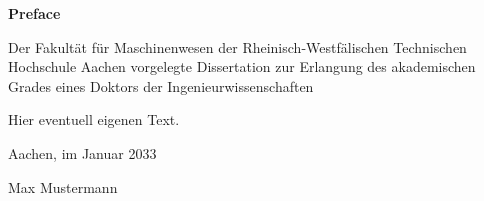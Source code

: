 \pagestyle{empty}

{\large \textbf{Preface}}

\vspace{3em}
\setlength{\emergencystretch}{10pt}


Der Fakultät für Maschinenwesen der Rheinisch-Westfälischen Technischen Hochschule Aachen vorgelegte Dissertation zur Erlangung des akademischen Grades eines Doktors der Ingenieurwissenschaften
\par
Hier eventuell eigenen Text.




\par 
Aachen, im Januar 2033
\par
Max Mustermann

